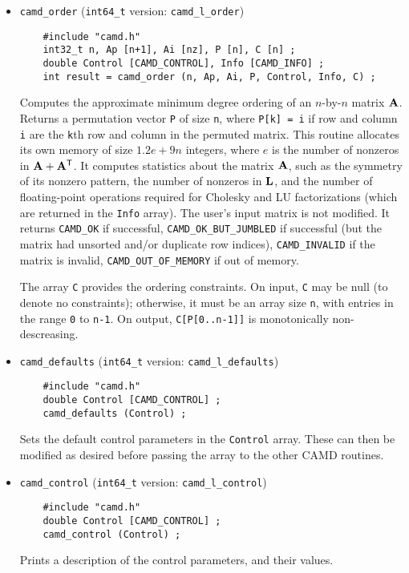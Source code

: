 \documentclass[11pt]{article}
\newcommand{\m}[1]{{\bf{#1}}}       %
\newcommand{\tr}{^{\sf T}}          %
\begin{document}
\begin{itemize}
\item {\tt camd\_order}
(\verb'int64_t' version: {\tt camd\_l\_order})
    {\footnotesize
    \begin{verbatim}
    #include "camd.h"
    int32_t n, Ap [n+1], Ai [nz], P [n], C [n] ;
    double Control [CAMD_CONTROL], Info [CAMD_INFO] ;
    int result = camd_order (n, Ap, Ai, P, Control, Info, C) ;
    \end{verbatim}
    }
    Computes the approximate minimum degree ordering of an $n$-by-$n$ matrix
    $\m{A}$.  Returns a permutation vector {\tt P} of size {\tt n}, where
    {\tt P[k] = i} if row and column {\tt i} are the {\tt k}th row and
    column in the permuted matrix.
    This routine allocates its own memory of size $1.2e+9n$ integers,
    where $e$ is the number of nonzeros in $\m{A}+\m{A}\tr$.
    It computes statistics about the matrix $\m{A}$, such as the symmetry of
    its nonzero pattern, the number of nonzeros in $\m{L}$,
    and the number of floating-point operations required for Cholesky and LU
    factorizations (which are returned in the {\tt Info} array).
    The user's input matrix is not modified.
    It returns {\tt CAMD\_OK} if successful,
    {\tt CAMD\_OK\_BUT\_JUMBLED} if successful (but the matrix had unsorted
    and/or duplicate row indices),
    {\tt CAMD\_INVALID} if the matrix is invalid,
    {\tt CAMD\_OUT\_OF\_MEMORY} if out of memory.

    The array {\tt C} provides the ordering constraints.
    On input, {\tt C} may be null (to denote no constraints);
    otherwise, it must be an array size {\tt n}, with entries in the range
    {\tt 0} to {\tt n-1}.
    On output, {\tt C[P[0..n-1]]} is monotonically non-descreasing.  

\item {\tt camd\_defaults}
(\verb'int64_t' version: {\tt camd\_l\_defaults})
    {\footnotesize
    \begin{verbatim}
    #include "camd.h"
    double Control [CAMD_CONTROL] ;
    camd_defaults (Control) ;
    \end{verbatim}
    }
    Sets the default control parameters in the {\tt Control} array.  These can
    then be modified as desired before passing the array to the other CAMD
    routines.

\item {\tt camd\_control}
(\verb'int64_t' version: {\tt camd\_l\_control})
    {\footnotesize
    \begin{verbatim}
    #include "camd.h"
    double Control [CAMD_CONTROL] ;
    camd_control (Control) ;
    \end{verbatim}
    }
    Prints a description of the control parameters, and their values.


\end{itemize}
\end{document}
